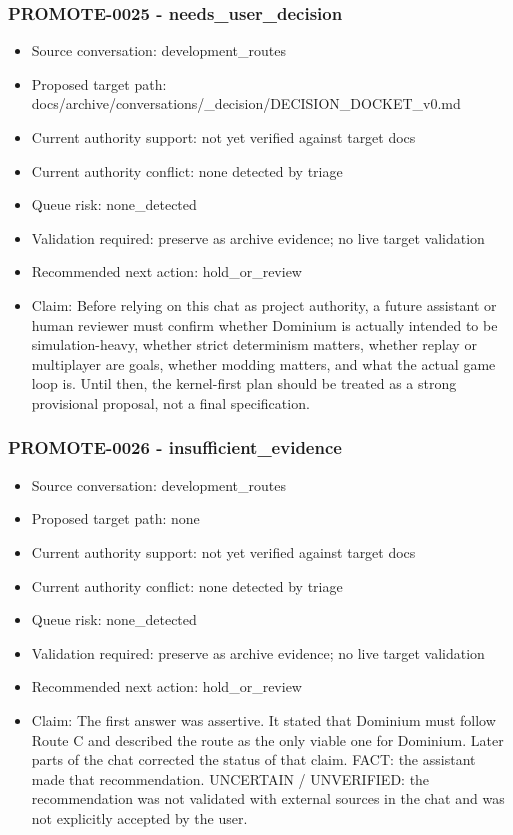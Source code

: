 \documentclass[11pt,a4paper]{report}
\begin{document}
\subsubsection{PROMOTE-0025 - needs\_user\_decision}

\begin{itemize}
\item Source conversation: development\_routes
\item Proposed target path: docs/archive/conversations/\_decision/DECISION\_DOCKET\_v0.md
\item Current authority support: not yet verified against target docs
\item Current authority conflict: none detected by triage
\item Queue risk: none\_detected
\item Validation required: preserve as archive evidence; no live target validation
\item Recommended next action: hold\_or\_review
\item Claim: Before relying on this chat as project authority, a future assistant or human reviewer must confirm whether Dominium is actually intended to be simulation-heavy, whether strict determinism matters, whether replay or multiplayer are goals, whether modding matters, and what the actual game loop is. Until then, the kernel-first plan should be treated as a strong provisional proposal, not a final specification.
\end{itemize}

\subsubsection{PROMOTE-0026 - insufficient\_evidence}

\begin{itemize}
\item Source conversation: development\_routes
\item Proposed target path: none
\item Current authority support: not yet verified against target docs
\item Current authority conflict: none detected by triage
\item Queue risk: none\_detected
\item Validation required: preserve as archive evidence; no live target validation
\item Recommended next action: hold\_or\_review
\item Claim: The first answer was assertive. It stated that Dominium must follow Route C and described the route as the only viable one for Dominium. Later parts of the chat corrected the status of that claim. FACT: the assistant made that recommendation. UNCERTAIN / UNVERIFIED: the recommendation was not validated with external sources in the chat and was not explicitly accepted by the user.
\end{itemize}
\end{document}

